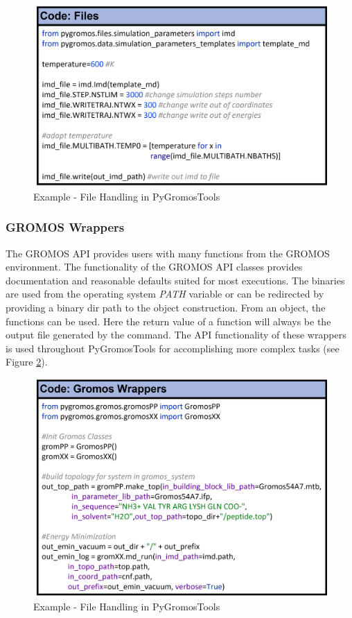 \begin{figure}[h]
    \centering
    \includegraphics[width=\textwidth]{fig/ApplicationExamples/codeExample_GROMOSFiles.png}
    \caption{Example - File Handling in PyGromosTools}
    \label{fig: FileHandlingExampleIMD}
\end{figure}


\subsubsection{GROMOS Wrappers}
The GROMOS API provides users with many functions from the GROMOS environment. The functionality of the GROMOS API classes provides documentation and reasonable defaults suited for most executions. The binaries are used from the operating system \textit{PATH} variable or can be redirected by providing a binary dir path to the object construction. From an object, the functions can be used. Here the return value of a function will always be the output file generated by the command. The API functionality of these wrappers is used throughout PyGromosTools for accomplishing more complex tasks (see Figure \ref{fig: GROMOSWrappers}).

\begin{figure}[h]
    \centering
    \includegraphics[width=\textwidth]{fig/ApplicationExamples/codeExample_GROMOSWrapper.png}
    \caption{Example - File Handling in PyGromosTools}
    \label{fig: GROMOSWrappers}
\end{figure}
